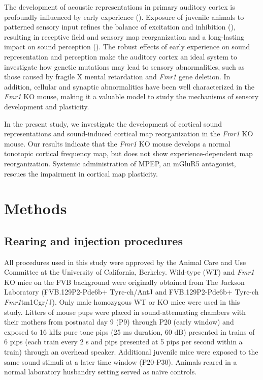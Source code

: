 The development of acoustic representations in primary auditory cortex is profoundly influenced by early experience (\cite{Zhang2001, DeVillers-Sidani2007, Insanally2009, Popescu2010}). Exposure of juvenile animals to patterned sensory input refines the balance of excitation and inhibition (\cite{Dorrn2010, Sun2010}), resulting in receptive field and sensory map reorganization and a long-lasting impact on sound perception (\cite{Han2007}). The robust effects of early experience on sound representation and perception make the auditory cortex an ideal system to investigate how genetic mutations may lead to sensory abnormalities, such as those caused by fragile X mental retardation and \textit{Fmr1} gene deletion. In addition, cellular and synaptic abnormalities have been well characterized in the \textit{Fmr1} KO mouse, making it a valuable model to study the mechanisms of sensory development and plasticity.

In the present study, we investigate the development of cortical sound representations and sound-induced cortical map reorganization in the \textit{Fmr1} KO mouse. Our results indicate that the \textit{Fmr1} KO mouse develops a normal tonotopic cortical frequency map, but does not show experience-dependent map reorganization. Systemic administration of MPEP, an mGluR5 antagonist, rescues the impairment in cortical map plasticity.

\section{Methods}

\subsection{Rearing and injection procedures}

All procedures used in this study were approved by the Animal Care and Use Committee at the University of California, Berkeley. Wild-type (WT) and \textit{Fmr1} KO mice on the FVB background were originally obtained from The Jackson Laboratory (FVB.129P2-Pde6b+ Tyrc-ch/AntJ and FVB.129P2-Pde6b+ Tyrc-ch \textit{Fmr1}tm1Cgr/J). Only male homozygous WT or KO mice were used in this study. Litters of mouse pups were placed in sound-attenuating chambers with their mothers from postnatal day 9 (P9) through P20 (early window) and exposed to 16 kHz pure tone pips (25 ms duration, 60 dB) presented in trains of 6 pips (each train every 2 s and pips presented at 5 pips per second within a train) through an overhead speaker. Additional juvenile mice were exposed to the same sound stimuli at a later time window (P20-P30). Animals reared in a normal laboratory husbandry setting served as na\"ive controls.

